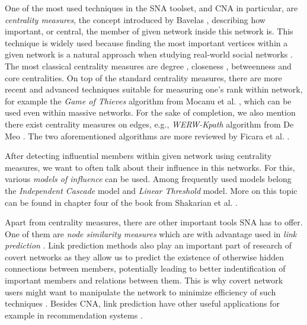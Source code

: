One of the most used techniques in the SNA toolset, and CNA in particular, are \emph{centrality measures},
the concept introduced by Bavelas \cite{Bavelas1948},
describing how important, or central, the member of given network inside this network is.
This technique is widely used because finding the most important vertices within a given network is a natural approach when studying real-world social networks \cite{Crescenzi2016}.
The most classical centrality measures are degree \cite{Shaw1954}, closeness \cite{Beauchamp1965},
betweenness \cite{Anthonisse1971,Freeman1977} and core \cite{Seidman1983} centralities.
On top of the standard centrality measures, there are more recent and advanced techniques suitable for measuring one's rank within network,
for example the \emph{Game of Thieves} algorithm from Mocanu et al. \cite{Mocanu2018}, which can be used even within massive networks.
For the sake of completion, we also mention there exist centrality measures on edges, e.g.,
\emph{WERW-Kpath} algorithm from {De Meo} \cite{DeMeo2013}.
The two aforementioned algorithms are more reviewed by Ficara et al. \cite{Ficara2021}.

After detecting influential members within given network using centrality measures,
we want to often talk about their influence in this networks.
For this, various \emph{models of influence} can be used.
Among frequently used models belong the \emph{Independent Cascade} model and \emph{Linear Threshold} model.
More on this topic can be found in chapter four of the book from Shakarian et al. \cite{Shakarian2015}.

Apart from centrality measures, there are other important tools SNA has to offer.
One of them are \emph{node similarity measures} which are with advantage used in \emph{link prediction} \cite{Zhou2009,Wang2014}.
Link prediction methods also play an important part of research of covert networks
as they allow us to predict the existence of otherwise hidden connections between members, potentially leading to
better indentification of important members and relations between them.
This is why covert network users might want to manipulate the network to minimize efficiency of such techniques \cite{Zhou2019}.
Besides CNA, link prediction have other useful applications for example in recommendation systems \cite{Huang2005,Talasu2017}.

